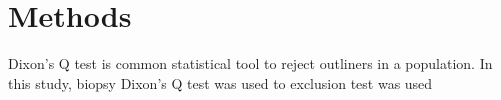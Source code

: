 \chapter{Methods}

Dixon's Q test is common statistical tool to reject outliners in a population. In this study, biopsy  Dixon's Q test was used to   exclusion test was used 